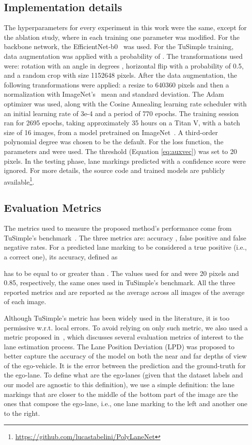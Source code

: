 \documentclass[a4paper,conference]{IEEEtran}
\begin{document}
\subsection{Implementation details}
The hyperparameters for every experiment in this work were the same, except for the ablation study, where in each training one parameter was modified. 
For the backbone network, the EfficientNet-b0~\cite{tan2019efficientnet} was used. For the TuSimple training, data augmentation was applied with a probability of . The transformations used were: rotation with an angle in degrees , horizontal flip with a probability of 0.5, and a random crop with size 1152648 pixels. After the data augmentation, the following transformations were applied: a resize to 640360 pixels and then a normalization with ImageNet's~\cite{imagenet_cvpr09} mean and standard deviation. The Adam optimizer was used, along with the Cosine Annealing learning rate scheduler with an initial learning rate of 3e-4 and a period of 770 epochs. The training session ran for 2695 epochs, taking approximately 35 hours on a Titan V, with a batch size of 16 images, from a model pretrained on ImageNet~\cite{imagenet_cvpr09}. A third-order polynomial degree was chosen to be the default. For the loss function, the parameters  and  were used. The threshold  (Equation \ref{eq:auxvec}) was set to 20 pixels. In the testing phase, lane markings predicted with a confidence score  were ignored. For more details, the source code and trained models are publicly available\footnote{\url{https://github.com/lucastabelini/PolyLaneNet}}.

\subsection{Evaluation Metrics}
\label{sec:evalmetrics}
The metrics used to measure the proposed method's performance come from TuSimple's benchmark~\cite{tusimple-benchmark}. The three metrics are: accuracy , false positive  and false negative  rates. For a predicted lane marking to be considered a true positive (i.e., a correct one), its accuracy, defined as

has to be equal to or greater than . The values used for  and  were 20 pixels and 0.85, respectively, the same ones used in TuSimple's benchmark. All the three reported metrics   and  are reported as the average across all images of the average of each image.

Although TuSimple's metric has been widely used in the literature, it is too permissive w.r.t. local errors. To avoid relying on only such metric, we also used a metric proposed in~\cite{satzoda2014icpr}, which discusses several evaluation metrics of interest to the lane estimation process. The Lane Position Deviation (LPD) was proposed to better capture the accuracy of the model on both the near and far depths of view of the ego-vehicle. It is the error between the prediction and the ground-truth for the ego-lane. To define what are the ego-lanes (given that the dataset labels and our model are agnostic to this definition), we use a simple definition: the lane markings that are closer to the middle of the bottom part of the image are the ones that compose the ego-lane, i.e., one lane marking to the left and another one to the right.
\end{document}
